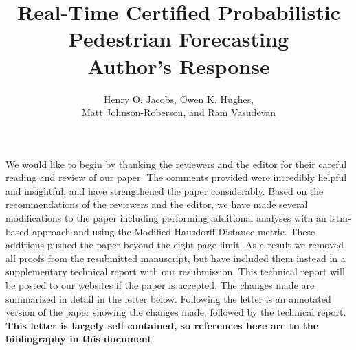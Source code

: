 \documentclass[usenames,dvipsnames]{article}
\title{\LARGE Real-Time Certified Probabilistic Pedestrian Forecasting \\ \textbf{Author's Response} }
\author{Henry O. Jacobs, Owen K. Hughes, \\ Matt Johnson-Roberson, and Ram Vasudevan }
\newcommand{\todo}[1]{\textcolor{red}{#1}}
\begin{document}
\maketitle


We would like to begin by thanking the reviewers and the editor for their careful reading and review of our paper.
The comments provided were incredibly helpful and insightful, and have strengthened the paper considerably.
Based on the recommendations of the reviewers and the editor, we have made several modifications to the paper including performing additional analyses with an lstm-based approach and using the Modified Hausdorff Distance metric. 
These additions pushed the paper beyond the eight page limit. 
As a result we removed all proofs from the resubmitted manuscript, but have included them instead in a supplementary technical report with our resubmission.
This technical report will be posted to our websites if the paper is accepted. 
The changes made are summarized in detail in the letter below. Following the letter is an annotated version of the paper showing the changes made, followed by the technical report. \textbf{This letter is largely self contained, so references here are to the bibliography in this document}.
\end{document}
